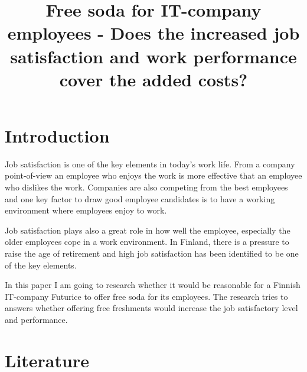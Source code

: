 \documentclass[a4paper]{article}
\begin{document}
\title{\huge Free soda for IT-company employees - Does the increased job satisfaction and work performance cover the added costs?}
\date{\vspace{-5ex}}
\maketitle

\large

\begin{comment}
\title{\huge Free soda for IT-company employees}
\date{2.1.2013}
\author{Mikko Koski \\ mikko.koski@aalto.fi}
\maketitle
\end{comment}

\large

\section{Introduction}

\begin{comment}
Why is this research important? 
Is there a bigger phenomenon that this research of yours is part of? 
Why people in your profession should care about this thesis?
\end{comment}

Job satisfaction is one of the key elements in today's work life. From a company point-of-view an employee who enjoys the work is more effective that an employee who dislikes the work. Companies are also competing from the best employees and one key factor to draw good employee candidates is to have a working environment where employees enjoy to work.

Job satisfaction plays also a great role in how well the employee, especially the older employees cope in a work environment. In Finland, there is a pressure to raise the age of retirement and high job satisfaction has been identified to be one of the key elements.

In this paper I am going to research whether it would be reasonable for a Finnish IT-company Futurice to offer free soda for its employees. The research tries to answers whether offering free freshments would increase the job satisfactory level and performance. 

\section{Literature}
\end{document}
